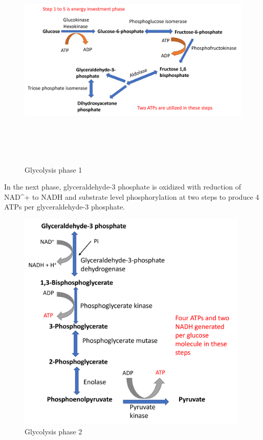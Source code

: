 \documentclass[
]{book}
\begin{document}
\begin{figure}
\centering
\includegraphics[width=\textwidth,height=4.16667in]{Images/Gly1.png}
\caption{Glycolysis phase 1}
\end{figure}

In the next phase, glyceraldehyde-3 phosphate is oxidized with reduction of NAD\^{}+ to NADH and substrate level phosphorylation at two steps to produce 4 ATPs per glyceraldehyde-3 phosphate.

\begin{figure}
\centering
\includegraphics[width=\textwidth,height=4.16667in]{Images/Gly2.png}
\caption{Glycolysis phase 2}
\end{figure}
\end{document}
